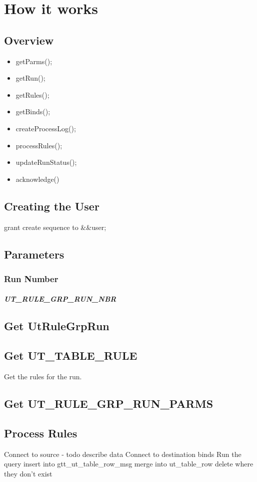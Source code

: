 \chapter{How it works}
\section{Overview}
\begin{itemize}
 \item getParms();
 \item getRun();
 \item getRules();
 \item getBinds();
 \item createProcessLog();
 \item processRules();
 \item updateRunStatus();
 \item acknowledge()
\end{itemize}
\section{Creating the User}
grant create sequence to &&user;
\section{Parameters}
\subsection{Run Number}
\paragraph{UT_RULE_GRP_RUN_NBR}
\section{Get UtRuleGrpRun}
\section{Get UT_TABLE_RULE}
Get the rules for the run.
\section{Get UT_RULE_GRP_RUN_PARMS}
\section{Process Rules}
Connect to source - todo describe data
Connect to destination
binds
Run the query
insert into gtt_ut_table_row_msg
merge into ut_table_row
delete where they don't exist

